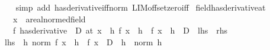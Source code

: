 \begin{isabellebody}
%
\isadelimproof
\ \ %
\endisadelimproof
%
\isatagproof
{}\isamarkupfalse%
\ {\isacharparenleft}{\kern0pt}simp\ add{\isacharcolon}{\kern0pt}\ has{\isacharunderscore}{\kern0pt}derivative{\isacharunderscore}{\kern0pt}iff{\isacharunderscore}{\kern0pt}norm\ LIM{\isacharunderscore}{\kern0pt}offset{\isacharunderscore}{\kern0pt}zero{\isacharunderscore}{\kern0pt}iff{\isacharparenright}{\kern0pt}%
\endisatagproof
{\isafoldproof}%
%
\isadelimproof
\isanewline
%
\endisadelimproof
\isanewline
{}\isamarkupfalse%
\ field{\isacharunderscore}{\kern0pt}has{\isacharunderscore}{\kern0pt}derivative{\isacharunderscore}{\kern0pt}at{\isacharcolon}{\kern0pt}\isanewline
\ \ \ x\ {\isacharcolon}{\kern0pt}{\isacharcolon}{\kern0pt}\ {\isachardoublequoteopen}{\isacharprime}{\kern0pt}a{\isacharcolon}{\kern0pt}{\isacharcolon}{\kern0pt}real{\isacharunderscore}{\kern0pt}normed{\isacharunderscore}{\kern0pt}field{\isachardoublequoteclose}\isanewline
\ \ \ {\isachardoublequoteopen}{\isacharparenleft}{\kern0pt}f\ has{\isacharunderscore}{\kern0pt}derivative\ {\isacharparenleft}{\kern0pt}{\isacharasterisk}{\kern0pt}{\isacharparenright}{\kern0pt}\ D{\isacharparenright}{\kern0pt}\ {\isacharparenleft}{\kern0pt}at\ x{\isacharparenright}{\kern0pt}\ {\isasymlongleftrightarrow}\ {\isacharparenleft}{\kern0pt}{\isasymlambda}h{\isachardot}{\kern0pt}\ {\isacharparenleft}{\kern0pt}f\ {\isacharparenleft}{\kern0pt}x\ {\isacharplus}{\kern0pt}\ h{\isacharparenright}{\kern0pt}\ {\isacharminus}{\kern0pt}\ f\ x{\isacharparenright}{\kern0pt}\ {\isacharslash}{\kern0pt}\ h{\isacharparenright}{\kern0pt}\ {\isasymmidarrow}{}{\isasymrightarrow}\ D{\isachardoublequoteclose}\ {\isacharparenleft}{\kern0pt}\ {\isachardoublequoteopen}{\isacharquery}{\kern0pt}lhs\ {\isacharequal}{\kern0pt}\ {\isacharquery}{\kern0pt}rhs{\isachardoublequoteclose}{\isacharparenright}{\kern0pt}\isanewline
%
\isadelimproof
%
\endisadelimproof
%
\isatagproof
{}\isamarkupfalse%
\ {\isacharminus}{\kern0pt}\isanewline
\ \ \isamarkupfalse%
\ {\isachardoublequoteopen}{\isacharquery}{\kern0pt}lhs\ {\isacharequal}{\kern0pt}\ {\isacharparenleft}{\kern0pt}{\isasymlambda}h{\isachardot}{\kern0pt}\ norm\ {\isacharparenleft}{\kern0pt}f\ {\isacharparenleft}{\kern0pt}x\ {\isacharplus}{\kern0pt}\ h{\isacharparenright}{\kern0pt}\ {\isacharminus}{\kern0pt}\ f\ x\ {\isacharminus}{\kern0pt}\ D\ {\isacharasterisk}{\kern0pt}\ h{\isacharparenright}{\kern0pt}\ {\isacharslash}{\kern0pt}\ norm\ h{\isacharparenright}{\kern0pt}\ {\isasymmidarrow}{}\ {\isasymrightarrow}\ {}{\isachardoublequoteclose}\isanewline

\end{isabellebody}
